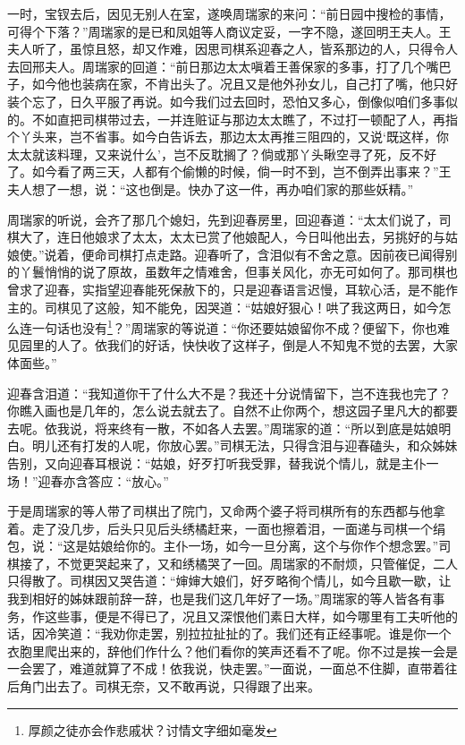 \documentclass[12pt,oneside]{book}
\begin{document}
一时，宝钗去后，因见无别人在室，遂唤周瑞家的来问：“前日园中搜检的事情，可得个下落？”周瑞家的是已和凤姐等人商议定妥，一字不隐，遂回明王夫人。王夫人听了，虽惊且怒，却又作难，因思司棋系迎春之人，皆系那边的人，只得令人去回邢夫人。周瑞家的回道：“前日那边太太嗔着王善保家的多事，打了几个嘴巴子，如今他也装病在家，不肯出头了。况且又是他外孙女儿，自己打了嘴，他只好装个忘了，日久平服了再说。如今我们过去回时，恐怕又多心，倒像似咱们多事似的。不如直把司棋带过去，一并连赃证与那边太太瞧了，不过打一顿配了人，再指个丫头来，岂不省事。如今白告诉去，那边太太再推三阻四的，又说‘既这样，你太太就该料理，又来说什么’，岂不反耽搁了？倘或那丫头瞅空寻了死，反不好了。如今看了两三天，人都有个偷懒的时候，倘一时不到，岂不倒弄出事来？”王夫人想了一想，说：“这也倒是。快办了这一件，再办咱们家的那些妖精。”

周瑞家的听说，会齐了那几个媳妇，先到迎春房里，回迎春道：“太太们说了，司棋大了，连日他娘求了太太，太太已赏了他娘配人，今日叫他出去，另挑好的与姑娘使。”说着，便命司棋打点走路。迎春听了，含泪似有不舍之意。因前夜已闻得别的丫鬟悄悄的说了原故，虽数年之情难舍，但事关风化，亦无可如何了。那司棋也曾求了迎春，实指望迎春能死保赦下的，只是迎春语言迟慢，耳软心活，是不能作主的。司棋见了这般，知不能免，因哭道：“姑娘好狠心！哄了我这两日，如今怎么连一句话也没有\footnote{厚颜之徒亦会作悲戚状？讨情文字细如毫发}？”周瑞家的等说道：“你还要姑娘留你不成？便留下，你也难见园里的人了。依我们的好话，快快收了这样子，倒是人不知鬼不觉的去罢，大家体面些。”

迎春含泪道：“我知道你干了什么大不是？我还十分说情留下，岂不连我也完了？你瞧入画也是几年的，怎么说去就去了。自然不止你两个，想这园子里凡大的都要去呢。依我说，将来终有一散，不如各人去罢。”周瑞家的道：“所以到底是姑娘明白。明儿还有打发的人呢，你放心罢。”司棋无法，只得含泪与迎春磕头，和众姊妹告别，又向迎春耳根说：“姑娘，好歹打听我受罪，替我说个情儿，就是主仆一场！”迎春亦含答应：“放心。”

于是周瑞家的等人带了司棋出了院门，又命两个婆子将司棋所有的东西都与他拿着。走了没几步，后头只见后头绣橘赶来，一面也擦着泪，一面递与司棋一个绢包，说：“这是姑娘给你的。主仆一场，如今一旦分离，这个与你作个想念罢。”司棋接了，不觉更哭起来了，又和绣橘哭了一回。周瑞家的不耐烦，只管催促，二人只得散了。司棋因又哭告道：“婶婶大娘们，好歹略徇个情儿，如今且歇一歇，让我到相好的姊妹跟前辞一辞，也是我们这几年好了一场。”周瑞家的等人皆各有事务，作这些事，便是不得已了，况且又深恨他们素日大样，如今哪里有工夫听他的话，因冷笑道：“我劝你走罢，别拉拉扯扯的了。我们还有正经事呢。谁是你一个衣胞里爬出来的，辞他们作什么？他们看你的笑声还看不了呢。你不过是挨一会是一会罢了，难道就算了不成！依我说，快走罢。”一面说，一面总不住脚，直带着往后角门出去了。司棋无奈，又不敢再说，只得跟了出来。
\end{document}
